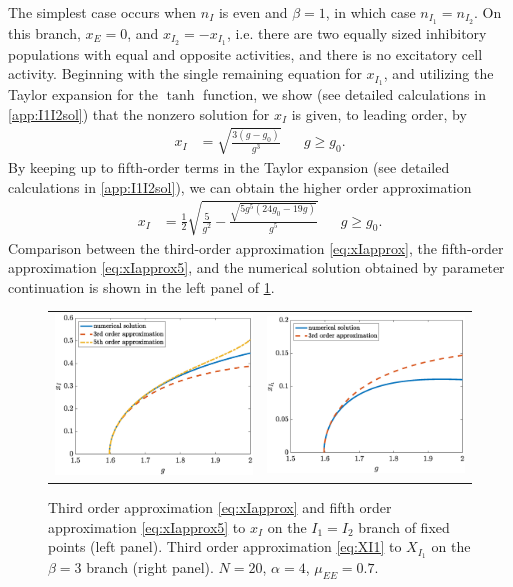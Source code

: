 \documentclass[reqno]{siamonline190516}
\begin{document}
The simplest case occurs when $n_I$ is even and $\beta = 1$, in which case $n_{I_1}=n_{I_2}$. On this branch, $x_E = 0$, and $x_{I_2} = -x_{I_1}$, i.e. there are two equally sized inhibitory populations with equal and opposite activities, and there is no excitatory cell activity. Beginning with the single remaining equation for $x_{I_1}$, and utilizing the Taylor expansion for the $\tanh$ function, we show (see detailed calculations in \cref{app:I1I2sol}) that the nonzero solution for $x_I$ is given, to leading order, by
\begin{align}\label{eq:xIapprox}
x_I &= \sqrt{ \frac{3(g - g_0) }{g^3}} && g \geq g_0.
\end{align}
By keeping up to fifth-order terms in the Taylor expansion (see detailed calculations in \cref{app:I1I2sol}), we can obtain the higher order approximation
\begin{align}\label{eq:xIapprox5}
x_I &= \frac{1}{2} \sqrt{ \frac{5}{g^2} - \frac{\sqrt{ 5 g^5( 24 g_0 - 19 g) }}{g^5}} && g \geq g_0.
\end{align}
Comparison between the third-order approximation \cref{eq:xIapprox}, the fifth-order approximation \cref{eq:xIapprox5}, and the numerical solution obtained by parameter continuation is shown in the left panel of \cref{fig:xIapprox}.

\begin{figure}
    \centering
    \begin{tabular}{cc}
    \includegraphics[width=7.8cm]{images/Xiapprox.eps} &
    \includegraphics[width=7.8cm]{images/Xiapproxbeta3.eps} 
    \end{tabular}
    \caption{Third order approximation \cref{eq:xIapprox} and fifth order approximation \cref{eq:xIapprox5} to $x_I$ on the $I_1=I_2$ branch of fixed points (left panel). Third order approximation \cref{eq:XI1} to $X_{I_1}$ on the $\beta=3$ branch (right panel). $N = 20$,  $\alpha = 4$, $\mu_{EE} = 0.7$.}
    \label{fig:xIapprox}
\end{figure}
\end{document}

